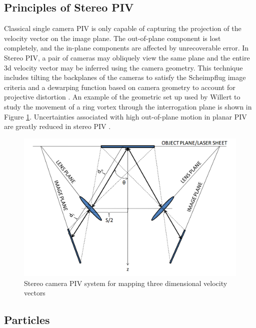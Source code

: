 \subsection{Principles of Stereo PIV}

Classical single camera PIV is only capable of capturing the projection of the 
velocity vector on the image plane. The out-of-plane component is lost 
completely, and the in-plane components are affected by unrecoverable error. In 
Stereo PIV, a pair of cameras may obliquely view the same plane and the entire 
3d velocity vector may be inferred using the camera geometry. This technique 
includes tilting the backplanes of the cameras to satisfy the Scheimpflug image 
criteria and a dewarping function based on camera geometry to account for 
projective distortion \cite{willert1997}. An example of the geometric set up 
used by Willert to study the movement of a ring vortex through the 
interrogation plane is shown in Figure \ref{fig:stereo_piv}. Uncertainties 
associated with high out-of-plane motion in planar PIV are greatly reduced in 
stereo PIV \cite{lawson1997b,lawson1997}.

\begin{figure}[H]
	\centering
	\includegraphics[width=5in]{figs/piv_method/stereo_piv_optics}
	\caption{Stereo camera PIV system for mapping three dimensional velocity 
		vectors}
	\label{fig:stereo_piv}
\end{figure}  

\subsection{Particles}

